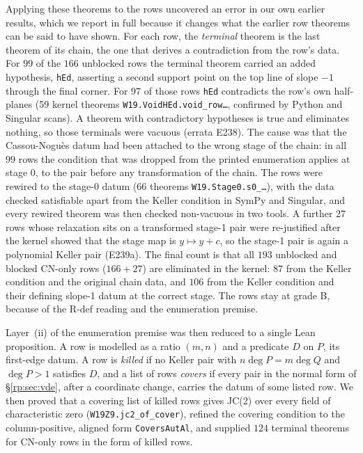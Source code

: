 \documentclass[a4paper,11pt]{article}
\theoremstyle{jsplain}
\theoremstyle{jsdef}
\theoremstyle{jsrem}
\begin{document}
Applying these theorems to the rows uncovered an error in our own earlier results, which we report in full because it changes what the earlier row theorems can be said to have shown. For each row, the \emph{terminal} theorem is the last theorem of its chain, the one that derives a contradiction from the row's data. For $99$ of the $166$ unblocked rows the terminal theorem carried an added hypothesis, \texttt{hEd}, asserting a second support point on the top line of slope $-1$ through the final corner. For $97$ of those rows \texttt{hEd} contradicts the row's own half-planes (59 kernel theorems \texttt{W19.\allowbreak{}VoidHEd.\allowbreak{}void\_\allowbreak{}row\dots}, confirmed by Python and Singular scans). A theorem with contradictory hypotheses is true and eliminates nothing, so those terminals were vacuous (errata E238). The cause was that the Cassou-Nogu\`es datum had been attached to the wrong stage of the chain: in all $99$ rows the condition that was dropped from the printed enumeration applies at stage $0$, to the pair before any transformation of the chain. The rows were rewired to the stage-$0$ datum (66 theorems \texttt{W19.\allowbreak{}Stage0.\allowbreak{}s0\_\allowbreak{}\dots}), with the data checked satisfiable apart from the Keller condition in SymPy and Singular, and every rewired theorem was then checked non-vacuous in two tools. A further $27$ rows whose relaxation sits on a transformed stage-1 pair were re-justified after the kernel showed that the stage map is $y\mapsto y+c$, so the stage-1 pair is again a polynomial Keller pair (E239a). The final count is that all $193$ unblocked and blocked CN-only rows ($166+27$) are eliminated in the kernel: $87$ from the Keller condition and the original chain data, and $106$ from the Keller condition and their defining slope-1 datum at the correct stage. The rows stay at grade B, because of the R-def reading and the enumeration premise.

Layer~(ii) of the enumeration premise was then reduced to a single Lean proposition. A row is modelled as a ratio $(m,n)$ and a predicate $D$ on $P$, its first-edge datum. A row is \emph{killed} if no Keller pair with $n\deg P=m\deg Q$ and $\deg P>1$ satisfies $D$, and a list of rows \emph{covers} if every pair in the normal form of \S\ref{rp:sec:vde}, after a coordinate change, carries the datum of some listed row. We then proved that a covering list of killed rows gives JC(2) over every field of characteristic zero (\texttt{W19Z9.\allowbreak{}jc2\_\allowbreak{}of\_\allowbreak{}cover}), refined the covering condition to the column-positive, aligned form \texttt{CoversAutAl}, and supplied $124$ terminal theorems for CN-only rows in the form of killed rows.
\end{document}
